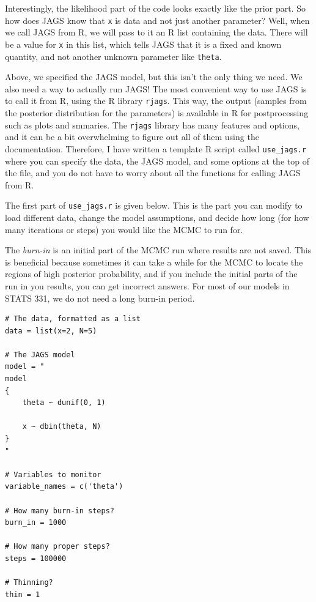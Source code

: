 Interestingly, the likelihood part of the code looks exactly like the
prior part. So how does JAGS know that {\tt x} is data and not just another
parameter? Well, when we call JAGS from R, we will pass to it an R list containing
the data. There will be a value for {\tt x} in this list, which tells JAGS that
it is a fixed and known quantity, and not another unknown parameter like {\tt theta}.

Above, we specified the JAGS model, but this isn't the only thing we need.
We also need a way to actually run JAGS! The most
convenient way to use JAGS is to call it from R, using the R library
{\tt rjags}. This way, the output (samples from the posterior distribution for
the parameters) is available in R for postprocessing such as plots and
smmaries. The
{\tt rjags} library has many features and options, and it can be a bit
overwhelming to figure out all of them using the documentation.
Therefore, I have written a template
R script called {\tt use\_jags.r} where you can specify the data, the JAGS
model, and some options at the
top of the file, and you do not have to worry about all the functions for
calling JAGS from R.

The first part of {\tt use\_jags.r} is given below. This is the part you
can modify to load different data, change the model assumptions, and decide
how long (for how many iterations or steps) you would like the MCMC to run for.

The {\it burn-in} is an initial part of the
MCMC run where results are not saved. This is beneficial because sometimes
it can take a while for the MCMC to locate the regions of high posterior
probability, and if you include the initial parts of the run in you results,
you can get incorrect answers. For most of our models in STATS 331, we do not
need a long burn-in period.

\begin{framed}
\begin{verbatim}
# The data, formatted as a list
data = list(x=2, N=5)

# The JAGS model
model = "
model
{
    theta ~ dunif(0, 1)

    x ~ dbin(theta, N)
}
"

# Variables to monitor
variable_names = c('theta')

# How many burn-in steps?
burn_in = 1000

# How many proper steps?
steps = 100000

# Thinning?
thin = 1
\end{verbatim}
\end{framed}

